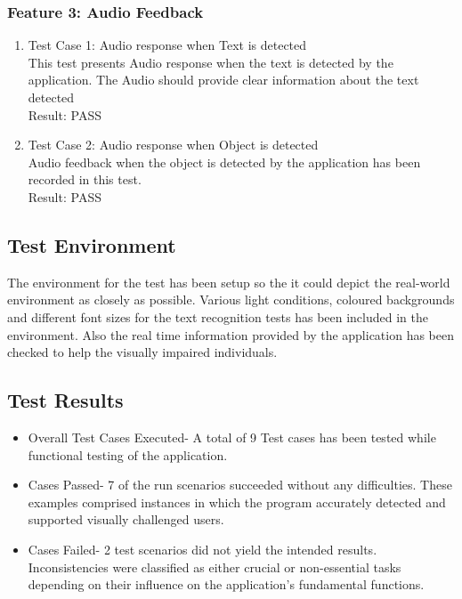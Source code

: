 \documentclass[MScCS]{uccthesis}
\begin{document}
\subsubsection{Feature 3: Audio Feedback}
\begin{enumerate}
    \item Test Case 1: Audio response when Text is detected
    \\This test presents Audio response when the text is detected by the application. The Audio should provide clear information about the text detected 
    \\Result: PASS
     \item Test Case 2: Audio response when Object is detected
    \\Audio feedback when the object is detected by the application has been recorded in this test.
    \\Result: PASS
   
\end{enumerate}

\subsection{Test Environment}

The environment for the test has been setup so the it could depict the real-world environment as closely as possible. Various light conditions, coloured backgrounds and different font sizes for the text recognition tests has been included in the environment. Also the real time information provided by the application has been checked to help the visually impaired individuals.

\subsection{Test Results}
\begin{itemize}
    \item Overall Test Cases Executed- A total of 9 Test cases has been tested while functional testing of the application.
    \item Cases Passed- 7 of the run scenarios succeeded without any difficulties. These examples comprised instances in which the program accurately detected and supported visually challenged users.
    \item Cases Failed- 2 test scenarios did not yield the intended results. Inconsistencies were classified as either crucial or non-essential tasks depending on their influence on the application's fundamental functions.
\end{itemize}
\end{document}

